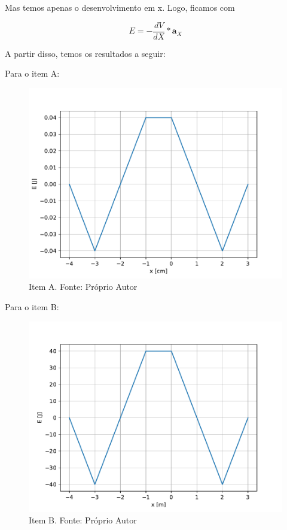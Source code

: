 Mas temos apenas o desenvolvimento em x. Logo, ficamos com 

\begin{equation}
	E = - \frac{dV}{dX}* \mathbf{a}_X
\end{equation}

A partir disso, temos os resultados a seguir:

Para o item A:

\begin{figure}[!h]
	\centering
	\includegraphics[scale= 0.6]{images/q5a.pdf}
	\caption{Item A. Fonte: Próprio Autor}
\end{figure}

\newpage

Para o item B:

\begin{figure}[!h]
	\centering
	\includegraphics[scale= 0.6]{images/q5b.pdf}
	\caption{Item B. Fonte: Próprio Autor}
\end{figure}


